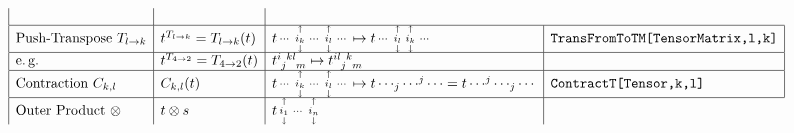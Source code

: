 \documentclass[9pt,a4paper]{scrartcl}
\begin{document}
\begin{align*}
\begin{array}{|l|l|l|l|}
\begin{smallmatrix}
              \end{smallmatrix}
                  &
    \\\hline
    \text{Push-Transpose } T_{l\rightarrow k}
        & t^{T_{l\rightarrow k}} = T_{l\rightarrow k}(t)
            &  t  \begin{smallmatrix} 
                               & \shortuparrow &       & \shortuparrow &\\
                \cdots         & i_{k}         & \cdots& i_{l} &\cdots    \\
                               & \shortdownarrow &     &  \shortdownarrow &
              \end{smallmatrix}  
              \mapsto t\begin{smallmatrix} 
                               & \shortuparrow & \shortuparrow &\\
                \cdots         & i_{l}         &  i_{k}&\cdots    \\
                               & \shortdownarrow & \shortdownarrow &
              \end{smallmatrix}
                & \texttt{TransFromToTM[TensorMatrix,l,k]}
    \\\hline
    \text{\eg}
        & t^{T_{4\rightarrow 2}} = T_{4\rightarrow 2}(t)
          & \tensor{t}{^{i}_{j}^{kl}_{m}} \mapsto \tensor{t}{^{il}_{j}^{k}_{m}}
              &    
    \\\hline 
    \text{Contraction } C_{k,l}
        & C_{k,l}(t)
            &t  \begin{smallmatrix} 
                               & \shortuparrow &       & \shortuparrow &\\
                \cdots         & i_{k}         & \cdots& i_{l} &\cdots    \\
                               & \shortdownarrow &     &  \shortdownarrow &
              \end{smallmatrix}
              \mapsto t\cdots_{j}\cdots^{j}\cdots = t\cdots^{j}\cdots_{j}\cdots
                  & \texttt{ContractT[Tensor,k,l]}
    \\\hline
    \text{Outer Product } \otimes
        & t\otimes s
            & t\begin{smallmatrix} 
                \shortuparrow &        & \shortuparrow \\
                i_{1}         &  \cdots& i_{n}     \\
                \shortdownarrow &     & \shortdownarrow
              \end{smallmatrix}

\end{array}
\end{align*}
\end{document}
